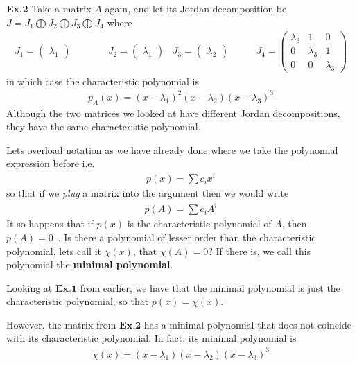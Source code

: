 \documentclass[a4paper,11pt]{exam}
\newcounter{ct}
\begin{document}
\begin{questions}
\begin{tcolorbox}[colback=black!1!,title=From Jordan form to characteristic polynomial]
    \textbf{Ex.2} Take a matrix $A$ again, and let its Jordan decomposition be $J =  J_1 \bigoplus J_2 \bigoplus J_3 \bigoplus J_4$ where
    \begin{align}
        J_1 = \begin{pmatrix} \lambda_1 \end{pmatrix} & \qquad\quad
        J_2 = \begin{pmatrix} \lambda_1 \end{pmatrix} &
        J_3 = \begin{pmatrix} \lambda_2 \end{pmatrix} &  \qquad
        J_4 = \begin{pmatrix} \lambda_3 & 1 & 0 \\ 0 & \lambda_3 & 1 \\ 0 & 0 & \lambda_3 \end{pmatrix}
    \end{align}
    in which case the characteristic polynomial is
    \begin{align}
        p_A(x) = (x - \lambda_1)^2 (x - \lambda_2) (x - \lambda_3)^3
    \end{align}
    Although the two matrices we looked at have different Jordan decompositions, they have the same characteristic polynomial. 
\end{tcolorbox}
Lets overload notation as we have already done where we take the polynomial expression before i.e.
\begin{align}
    p(x) = \sum c_i x^i
\end{align}
so that if we \textit{plug} a matrix into the argument then we would write
\begin{align}
    p(A) = \sum c_i A^i
\end{align}
It so happens that if $p(x)$ is the characteristic polynomial of $A$, then $p(A) = 0$~\cite{hirsch1974differential}.  Is there a polynomial of lesser order than the characteristic polynomial, lets call it $\chi(x)$, that $\chi(A) = 0$? If there is, we call this polynomial the \textbf{minimal polynomial}.  
\begin{tcolorbox}[colback=black!1!,title=Minimal polynomials]
    Looking at $\textbf{Ex.1}$ from earlier, we have that the minimal polynomial is just the characteristic polynomial, so that $p(x) = \chi(x)$.\newline

    However, the matrix from $\textbf{Ex.2}$ has a minimal polynomial that does not coincide with its characteristic polynomial.  In fact, its minimal polynomial is
    \begin{align}
        \chi(x) = (x - \lambda_1)(x - \lambda_2)(x - \lambda_3)^3
    \end{align}
\end{tcolorbox}
\newpage

\end{questions}
\end{document}
